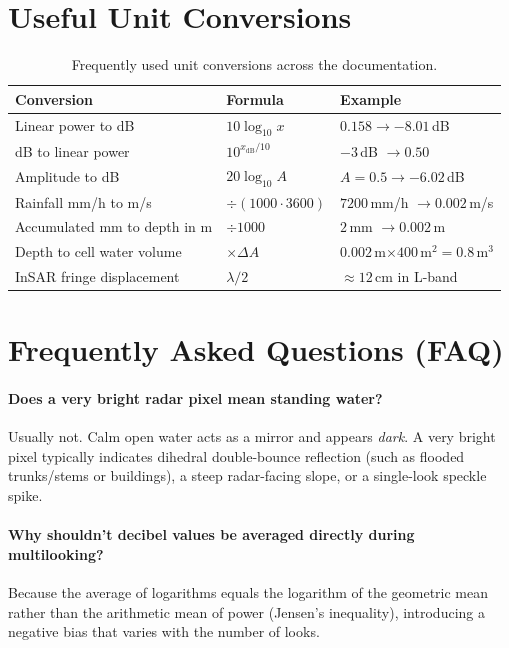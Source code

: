 \documentclass[11pt,a4paper]{article}
\begin{document}
\section{Useful Unit Conversions}
\label{sec:conversiones}

\begin{table}[htbp]
\centering\small
\begin{tabular}{lll}
\toprule
Conversion & Formula & Example\\\midrule
Linear power to dB & $10\log_{10}x$ & $0.158\to-8.01$\,dB\\
dB to linear power & $10^{x_{\mathrm{dB}}/10}$ & $-3$\,dB $\to0.50$\\
Amplitude to dB & $20\log_{10}A$ & $A=0.5\to-6.02$\,dB\\
Rainfall mm/h to m/s & $\div(1000\cdot3600)$ & $7200$\,mm/h $\to0.002$\,m/s\\
Accumulated mm to depth in m & $\div1000$ & $2$\,mm $\to0.002$\,m\\
Depth to cell water volume & $\times\Delta A$ & $0.002$\,m$\times400$\,m$^2=0.8$\,m$^3$\\
InSAR fringe displacement & $\lambda/2$ & $\approx12$\,cm in L-band\\\bottomrule
\end{tabular}
\caption{Frequently used unit conversions across the documentation.}
\label{tab:conversiones}
\end{table}

\section{Frequently Asked Questions (FAQ)}
\label{sec:faq}

\paragraph{Does a very bright radar pixel mean standing water?}
Usually not. Calm open water acts as a mirror and appears \emph{dark}. A very bright pixel typically indicates dihedral double-bounce reflection (such as flooded trunks/stems or buildings), a steep radar-facing slope, or a single-look speckle spike.

\paragraph{Why shouldn't decibel values be averaged directly during multilooking?}
Because the average of logarithms equals the logarithm of the geometric mean rather than the arithmetic mean of power (Jensen's inequality), introducing a negative bias that varies with the number of looks.
\end{document}
